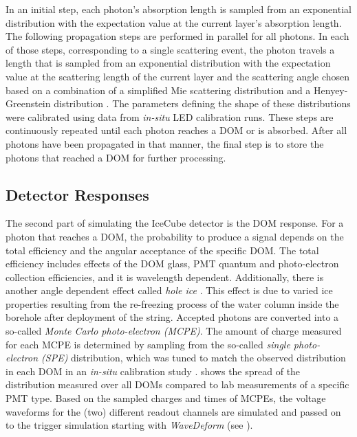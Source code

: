 In an initial step, each photon's absorption length is sampled from an exponential distribution with the expectation value at the current layer's absorption length. The following propagation steps are performed in parallel for all photons. In each of those steps, corresponding to a single scattering event, the photon travels a length that is sampled from an exponential distribution with the expectation value at the scattering length of the current layer and the scattering angle chosen based on a combination of a simplified Mie scattering distribution  and a Henyey-Greenstein distribution  . The parameters defining the shape of these distributions were calibrated using data from \textit{in-situ} LED calibration runs. These steps are continuously repeated until each photon reaches a DOM or is absorbed. After all photons have been propagated in that manner, the final step is to store the photons that reached a DOM for further processing.


\subsection{Detector Responses}

The second part of simulating the IceCube detector is the DOM response. For a photon that reaches a DOM, the probability to produce a signal depends on the total efficiency and the angular acceptance of the specific DOM. The total efficiency includes effects of the DOM glass, PMT quantum and photo-electron collection efficiencies, and it is wavelength dependent. Additionally, there is another angle dependent effect called \textit{hole ice} . This effect is due to varied ice properties resulting from the re-freezing process of the water column inside the borehole after deployment of the string. Accepted photons are converted into a so-called \textit{Monte Carlo photo-electron (MCPE)}. The amount of charge measured for each MCPE is determined by sampling
from the so-called \textit{single photo-electron (SPE)} distribution, which was tuned to match the observed distribution in each DOM in an \textit{in-situ} calibration study .  shows the spread of the distribution measured over all DOMs compared to lab measurements of a specific PMT type. Based on the sampled charges and times of MCPEs, the voltage waveforms for the (two) different readout channels are simulated and passed on to the trigger simulation starting with \textit{WaveDeform} (see ).

